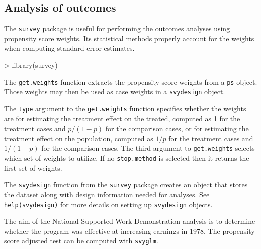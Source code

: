 \documentclass{article}
\begin{document}
\subsection{Analysis of outcomes}
The \texttt{survey} package is useful for performing the outcomes analyses
using propensity score weights. Its statistical methods properly account for
the weights when computing standard error estimates.

\begin{Schunk}
\begin{Sinput}
> library(survey)
\end{Sinput}
\end{Schunk}

The \texttt{get.weights} function extracts the propensity score weights from a
\texttt{ps} object. Those weights may then be used as case weights in a
\texttt{svydesign} object.

\begin{Schunk}
\end{Schunk}

The \texttt{type} argument to the \texttt{get.weights} function specifies
whether the weights are for estimating the treatment effect on the treated,
computed as 1 for the treatment cases and $p/(1-p)$ for the comparison cases,
or for estimating the treatment effect on the population, computed as $1/p$ for
the treatment cases and $1/(1-p)$ for the comparison cases. The third argument
to \texttt{get.weights} selects which set of weights to utilize. If no
\texttt{stop.method} is selected then it returns the first set of weights.

The \texttt{svydesign} function from the \texttt{survey} package creates an
object that stores the dataset along with design information needed for
analyses. See \texttt{help(svydesign)} for more details on setting up
\texttt{svydesign} objects.

The aim of the National Supported Work Demonstration analysis is to determine
whether the program was effective at increasing earnings in 1978. The
propensity score adjusted test can be computed with \texttt{svyglm}.
\end{document}
